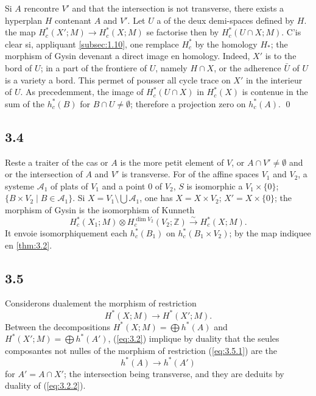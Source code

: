 \documentclass[11pt,a4paper]{article}
\theoremstyle{plain}
\theoremstyle{definition}
\begin{document}
Si $A$ rencontre $V'$ and that the intersection is not transverse, there exists a hyperplan $H$ contenant $A$ and $V'$. Let $U$ a of the deux demi-spaces defined by $H$. the map $H^*_c(X';M) \to H^*_c(X;M)$ se factorise then by $H^*_c(U \cap X;M)$. C'is clear si, appliquant \ref{subsec:1.10}, one remplace $H^*_c$ by the homology $H_*$; the morphism of Gysin devenant a direct image en homology. Indeed, $X'$ is to the bord of $U$; in a part of the frontiere of $U$, namely $H \cap X$, or the adherence $\bar{U}$ of $U$ is a variety a bord. This permet of pousser all cycle trace on $X'$ in the interieur of $U$. As precedemment, the image of $H^*_c(U \cap X)$ in $H^*_c(X)$ is contenue in the sum of the $h^*_c(B)$ for $B \cap U \neq \emptyset$; therefore a projection zero on $h^*_c(A)$.
\qed

\subsection{3.4}\label{subsec:3.4}

Reste a traiter of the cas or $A$ is the more petit element of $V$, or $A \cap V' \neq \emptyset$ and or the intersection of $A$ and $V'$ is transverse. For of the affine spaces $V_1$ and $V_2$, a systeme $\mathcal{A}_1$ of plats of $V_1$ and a point $0$ of $V_2$, $S$ is isomorphic a $V_1 \times \{0\}$; $\{B \times V_2 \mid B \in \mathcal{A}_1\}$. Si $X = V_1 \setminus \bigcup\mathcal{A}_1$, one has $X = X \times V_2$; $X' = X \times \{0\}$; the morphism of Gysin is the isomorphism of Kunneth
\[H^*_c(X_1;M) \otimes H^{\dim V_2}_c(V_2;\mathbb{Z}) \xrightarrow{\sim} H^*_c(X;M).\]
It envoie isomorphiquement each $h^*_c(B_1)$ on $h^*_c(B_1 \times V_2)$; by the map indiquee en \ref{thm:3.2}.

\subsection{3.5}\label{subsec:3.5}

Considerons dualement the morphism of restriction
\begin{equation}\label{eq:3.5.1}
H^*(X;M) \longrightarrow H^*(X';M).
\tag{3.5.1}
\end{equation}
Between the decompositions $H^*(X;M) = \bigoplus h^*(A)$ and $H^*(X';M) = \bigoplus h^*(A')$, (\ref{eq:3.2}) implique by duality that the seules composantes not nulles of the morphism of restriction (\ref{eq:3.5.1}) are the
\[h^*(A) \longrightarrow h^*(A')\]
for $A' = A \cap X'$; the intersection being transverse, and they are deduits by duality of (\ref{eq:3.2.2}).
\end{document}
